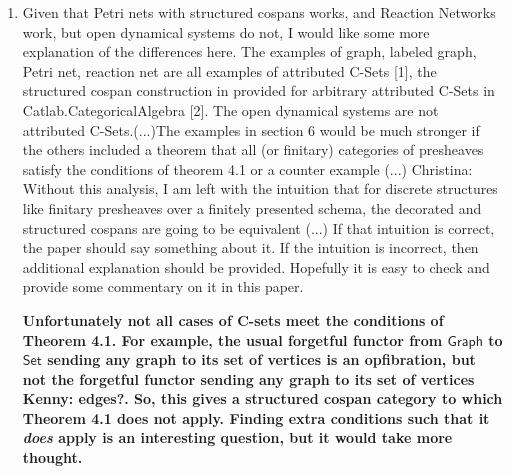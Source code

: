 \documentclass[reqno]{amsart}
\def\chris{\color{purple} Christina: }
\def\john{\color{red} John: }
\def\kenny{\color{blue} Kenny: }
\begin{document}
\begin{enumerate}
{\chris By the way, there is this sentence ''However, it should be clear by now that so
far, in cases where either structured or decorated cospans can be used, structured cospans are simpler. '' in section 6. Perhaps we could even imply 
that somewhere in the intro as well?}

{\kenny The boldface looks good to me, but I also like Christina's suggestions above if we really want to make an effort to appease this referee. I'm fine either way on this.}


\fi 

{\john See if you like my new remarks in boldface, and give me a check mark if you do!  Kenny had checked this one off already, but I've changed it a 
lot.}

{\chris Looks great to me. Final two minor points, feel free to ignore or not and delete this comment. (1) Is ``apparently'' supposed to sound a bit 
sceptical? If not, would ``actually'' be better or not? (2) If we were being really accurate, don't we 
actually ONLY use decorated cospans to describe the map from open Petri nets with rates to open dynamical systems? Namely since dynamical systems only 
work as decorated cospans, we are required to use decorated cospans also for Petri nets to then get the map between them. Unless I am mixing something 
there.}

\item Given that Petri nets with structured cospans works, and Reaction Networks work, but open dynamical systems do not, I would like some more 
explanation of the differences here. The examples of graph, labeled 
graph, Petri net, reaction net are all examples of attributed C-Sets [1], the structured cospan construction in provided for arbitrary attributed 
C-Sets in Catlab.CategoricalAlgebra [2]. The open dynamical systems are not attributed C-Sets.(...)The examples in section 6 would be much stronger 
if the others included a theorem that all (or finitary) categories of presheaves satisfy the 
conditions of theorem 4.1 or a counter example (...) {\chris Without this analysis, I am left with the intuition
that for discrete structures like finitary presheaves over a finitely presented schema, the decorated and structured cospans are going
to be equivalent (...) If that intuition is correct, the paper should say something about it. If the intuition is incorrect, then additional 
explanation should be provided.} Hopefully it is easy to check and provide some commentary on it in this paper.

{\bf Unfortunately not all cases of C-sets meet the conditions of Theorem 4.1.   For example, the usual forgetful functor from $\mathsf{Graph}$ to $\mathsf{Set}$ sending any graph to its set of vertices is an opfibration, but not the forgetful functor sending any graph to its set of vertices {\kenny edges?}.  So, this gives a structured cospan category to which Theorem 4.1 does not apply.   Finding extra conditions such that it \emph{does} apply is an interesting question, but it would take more thought.}


\end{enumerate}
\end{document}
